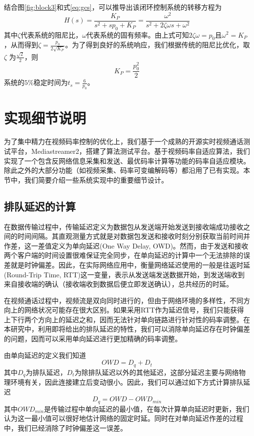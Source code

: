     结合图\ref{fig:block3}和式\ref{eq:gcs}，可以推导出该闭环控制系统的转移方程为
    \begin{equation}\label{eq:transfer}
        H(s) = \frac{K_P}{s^2 + s p_0 + K_P} = \frac{\omega^2}{s^2 + 2 \zeta \omega s + \omega^2}
    \end{equation}
    其中$\zeta$代表系统的阻尼比，$\omega$代表系统的固有频率。由上式可知$2 \zeta \omega = p_0$且$\omega^2 = K_P$，从而得到$\zeta = \frac{p_0}{2\sqrt{K_P}}$。为了得到良好的系统响应，我们根据传统的阻尼比优化，取$\zeta$ 为$\frac{\sqrt{2}}{2}$\cite{franklin2006feedback}，则
    \begin{equation}\label{eq:k}
        K_P = \frac{p_0^2}{2}
    \end{equation}
    系统的$5\%$稳定时间为$t_s = \frac{6}{p_0}$。


\section{实现细节说明}
为了集中精力在视频码率控制的优化上，我们基于一个成熟的开源实时视频通话测试平台，Mediastreamer2，搭建了算法测试平台。基于视频码率自适应算法，我们实现了一个包含反网络信息采集和发送、最优码率计算等功能的码率自适应模块。除此之外的大部分功能（如视频采集、码率可变编解码等）都沿用了已有实现。本节中，我们简要介绍一些系统实现中的重要细节设计。

    \subsection{排队延迟的计算}\label{chap:qd_calc}
    在数据传输过程中，传输延迟定义为数据包从发送端开始发送到接收端成功接收之间的时间间隔。其直观测量方式就是对数据包发送和接收时刻分别获取当前时间并作差，这一差值定义为单向延迟(One Way Delay, OWD)。然而，由于发送和接收两个客户端的时间设置很难保证完全同步，在单向延迟的计算中一个无法排除的误差就是时钟偏差。因此，在实际网络应用中，衡量网络延迟使用的一般是往返时延(Round-Trip Time, RTT)这一变量，表示从发送端发送数据开始，到发送端收到来自接收端的确认（接收端收到数据后便立即发送确认），总共经历的时延。

    在视频通话过程中，视频流是双向同时进行的，但由于网络环境的多样性，不同方向上的网络状况可能存在很大区别。如果采用RTT作为延迟信号，我们只能获得上下行两个方向上的延迟之和，因而无法针对单向链路进行针对性的码率调整。在本研究中，利用即将给出的排队延迟的特性，我们可以消除单向延迟存在时钟偏差的问题，因而可以采用单向延迟进行更加精确的码率调整。

    由单向延迟的定义我们知道
    \begin{equation}\label{eq:owd}
        OWD = D_q + D_t
    \end{equation}
    其中$D_q$为排队延迟，$D_t$为除排队延迟以外的其他延迟，这部分延迟主要与网络物理环境有关，因此连接建立后变动很小。因此，我们可以通过如下方式计算排队延迟
    \begin{equation}\label{eq:qd}
        D_q = OWD - OWD_{min}
    \end{equation}
    其中$OWD_{min}$是传输过程中单向延迟的最小值，在每次计算单向延迟时更新，我们认为这一最小值可以很好地估计网络的固定时延。同时在对单向延迟作差的过程中，我们已经消除了时钟偏差这一误差。

